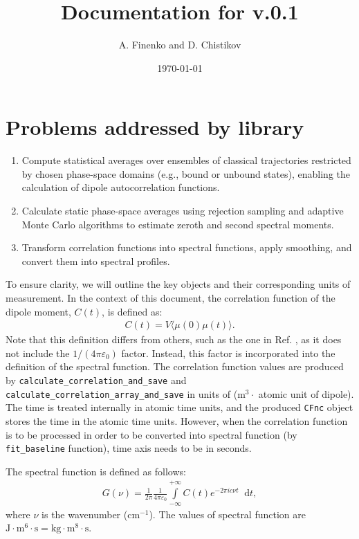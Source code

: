 \documentclass{article}
\title{Documentation for \libname v.0.1}
\author{A. Finenko and D. Chistikov}
\date{\today}
\newcommand*\diff{\mathop{}\!\mathrm{d}}
\newcommand{\intty}{\int\limits_{-\infty}^{+\infty}}
\begin{document}
\maketitle

\tableofcontents
\newpage 

\section{Problems addressed by library}
\label{sec:tasks}

\begin{enumerate}
\item Compute statistical averages over ensembles of classical trajectories restricted by chosen phase-space domains (e.g., bound or unbound states), enabling the calculation of dipole autocorrelation functions. 
\item Calculate static phase-space averages using rejection sampling and adaptive Monte Carlo algorithms to estimate zeroth and second spectral moments.
\item Transform correlation functions into spectral functions, apply smoothing, and convert them into spectral profiles.
\end{enumerate}


To ensure clarity, we will outline the key objects and their corresponding units of measurement. In the context of this document, the correlation function of the dipole moment, $C(t)$, is defined as:
\begin{gather}
    C(t) = V \langle \mu(0) \mu(t) \rangle.
\end{gather}
%
Note that this definition differs from others, such as the one in Ref. \cite{Chistikov2021}, as it does not include the 
$1/(4 \pi \varepsilon_0)$ factor. Instead, this factor is incorporated into the definition of the spectral function. The correlation function values are produced by \texttt{calculate\_correlation\_and\_save} and \texttt{calculate\_correlation\_array\_and\_save} in units of (m$^3 \cdot$ atomic unit of dipole). The time is treated internally in atomic time units, and the produced \texttt{CFnc} object stores the time in the atomic time units. However, when the correlation function is to be processed in order to be converted into spectral function (by \texttt{fit\_baseline} function), time axis needs to be in seconds.

The spectral function is defined as follows:
\begin{gather}
    G(\nu) = \frac{1}{2\pi} \frac{1}{4\pi \varepsilon_0} \intty C(t) e^{-2 \pi i c \nu t} \diff{t},
\end{gather}
%
where $\nu$ is the wavenumber (cm$^{-1}$). The values of spectral function are $\text{J} \cdot \text{m}^6 \cdot \text{s} = \text{kg} \cdot \text{m}^8 \cdot \text{s}$. 
\end{document}
